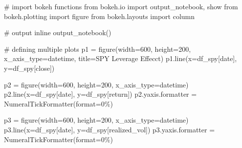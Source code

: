 \documentclass[
  letterpaper,
  DIV=11,
  numbers=noendperiod]{scrreprt}
\newenvironment{Shaded}{\begin{snugshade}}{\end{snugshade}}
\newcommand{\BuiltInTok}[1]{\textcolor[rgb]{0.00,0.23,0.31}{#1}}
\newcommand{\CommentTok}[1]{\textcolor[rgb]{0.37,0.37,0.37}{#1}}
\newcommand{\DecValTok}[1]{\textcolor[rgb]{0.68,0.00,0.00}{#1}}
\newcommand{\ImportTok}[1]{\textcolor[rgb]{0.00,0.46,0.62}{#1}}
\newcommand{\NormalTok}[1]{\textcolor[rgb]{0.00,0.23,0.31}{#1}}
\newcommand{\OperatorTok}[1]{\textcolor[rgb]{0.37,0.37,0.37}{#1}}
\newcommand{\StringTok}[1]{\textcolor[rgb]{0.13,0.47,0.30}{#1}}
\begin{document}
\begin{Shaded}
\begin{Highlighting}[]
\CommentTok{\# import bokeh functions}
\ImportTok{from}\NormalTok{ bokeh.io }\ImportTok{import}\NormalTok{ output\_notebook, show}
\ImportTok{from}\NormalTok{ bokeh.plotting }\ImportTok{import}\NormalTok{ figure}
\ImportTok{from}\NormalTok{ bokeh.layouts }\ImportTok{import}\NormalTok{ column}

\CommentTok{\# output inline}
\NormalTok{output\_notebook()}

\CommentTok{\# defining multiple plots}
\NormalTok{p1 }\OperatorTok{=}\NormalTok{ figure(width}\OperatorTok{=}\DecValTok{600}\NormalTok{, height}\OperatorTok{=}\DecValTok{200}\NormalTok{, x\_axis\_type}\OperatorTok{=}\StringTok{\textquotesingle{}datetime\textquotesingle{}}\NormalTok{, title}\OperatorTok{=}\StringTok{\textquotesingle{}SPY Leverage Effecct\textquotesingle{}}\NormalTok{)}
\NormalTok{p1.line(x}\OperatorTok{=}\NormalTok{df\_spy[}\StringTok{\textquotesingle{}date\textquotesingle{}}\NormalTok{], y}\OperatorTok{=}\NormalTok{df\_spy[}\StringTok{\textquotesingle{}close\textquotesingle{}}\NormalTok{])}

\NormalTok{p2 }\OperatorTok{=}\NormalTok{ figure(width}\OperatorTok{=}\DecValTok{600}\NormalTok{, height}\OperatorTok{=}\DecValTok{200}\NormalTok{, x\_axis\_type}\OperatorTok{=}\StringTok{\textquotesingle{}datetime\textquotesingle{}}\NormalTok{)}
\NormalTok{p2.line(x}\OperatorTok{=}\NormalTok{df\_spy[}\StringTok{\textquotesingle{}date\textquotesingle{}}\NormalTok{], y}\OperatorTok{=}\NormalTok{df\_spy[}\StringTok{\textquotesingle{}return\textquotesingle{}}\NormalTok{])}
\NormalTok{p2.yaxis.formatter }\OperatorTok{=}\NormalTok{ NumeralTickFormatter(}\BuiltInTok{format}\OperatorTok{=}\StringTok{\textquotesingle{}0\%\textquotesingle{}}\NormalTok{)}

\NormalTok{p3 }\OperatorTok{=}\NormalTok{ figure(width}\OperatorTok{=}\DecValTok{600}\NormalTok{, height}\OperatorTok{=}\DecValTok{200}\NormalTok{, x\_axis\_type}\OperatorTok{=}\StringTok{\textquotesingle{}datetime\textquotesingle{}}\NormalTok{)}
\NormalTok{p3.line(x}\OperatorTok{=}\NormalTok{df\_spy[}\StringTok{\textquotesingle{}date\textquotesingle{}}\NormalTok{], y}\OperatorTok{=}\NormalTok{df\_spy[}\StringTok{\textquotesingle{}realized\_vol\textquotesingle{}}\NormalTok{])}
\NormalTok{p3.yaxis.formatter }\OperatorTok{=}\NormalTok{ NumeralTickFormatter(}\BuiltInTok{format}\OperatorTok{=}\StringTok{\textquotesingle{}0\%\textquotesingle{}}\NormalTok{)}


\end{Highlighting}
\end{Shaded}
\end{document}
